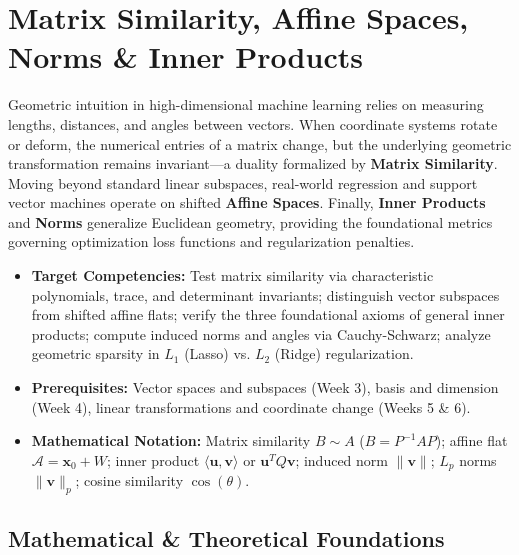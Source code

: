 \chapter{Matrix Similarity, Affine Spaces, Norms \& Inner Products}

Geometric intuition in high-dimensional machine learning relies on measuring lengths, distances, and angles between vectors. When coordinate systems rotate or deform, the numerical entries of a matrix change, but the underlying geometric transformation remains invariant—a duality formalized by \textbf{Matrix Similarity}. Moving beyond standard linear subspaces, real-world regression and support vector machines operate on shifted \textbf{Affine Spaces}. Finally, \textbf{Inner Products} and \textbf{Norms} generalize Euclidean geometry, providing the foundational metrics governing optimization loss functions and regularization penalties.

\vspace{0.5cm}
\begin{tcolorbox}[colback=primarylight, colframe=primarydark, title={\textbf{Executive Roadmap \& Learning Objectives}}]
\begin{itemize}
    \item \textbf{Target Competencies:} Test matrix similarity via characteristic polynomials, trace, and determinant invariants; distinguish vector subspaces from shifted affine flats; verify the three foundational axioms of general inner products; compute induced norms and angles via Cauchy-Schwarz; analyze geometric sparsity in $L_1$ (Lasso) vs. $L_2$ (Ridge) regularization.
    \item \textbf{Prerequisites:} Vector spaces and subspaces (Week 3), basis and dimension (Week 4), linear transformations and coordinate change (Weeks 5 \& 6).
    \item \textbf{Mathematical Notation:} Matrix similarity $B \sim A$ ($B = P^{-1} A P$); affine flat $\mathcal{A} = \mathbf{x}_0 + W$; inner product $\langle \mathbf{u}, \mathbf{v} \rangle$ or $\mathbf{u}^T Q \mathbf{v}$; induced norm $\|\mathbf{v}\|$; $L_p$ norms $\|\mathbf{v}\|_p$; cosine similarity $\cos(\theta)$.
\end{itemize}
\end{tcolorbox}

\section{Mathematical \& Theoretical Foundations}

